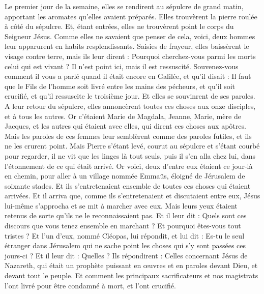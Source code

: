 \begin{multicols}{2}
\VerseOne{}Le premier jour de la semaine, elles se rendirent au sépulcre de grand matin, apportant les aromates qu'elles avaient préparés.
Elles trouvèrent la pierre roulée à côté du sépulcre.
Et, étant entrées, elles ne trouvèrent point le corps du Seigneur Jésus.
Comme elles ne savaient que penser de cela, voici, deux hommes leur apparurent en habits resplendissants.
Saisies de frayeur, elles baissèrent le visage contre terre, mais ils leur dirent : Pourquoi cherchez-vous parmi les morts celui qui est vivant ?
Il n'est point ici, mais il est ressuscité. Souvenez-vous comment il vous a parlé quand il était encore en Galilée,
et qu'il disait : Il faut que le Fils de l'homme soit livré entre les mains des pécheurs, et qu'il soit crucifié, et qu'il ressuscite le troisième jour.
Et elles se souvinrent de ses paroles.
A leur retour du sépulcre, elles annoncèrent toutes ces choses aux onze disciples, et à tous les autres.
Or c'étaient Marie de Magdala, Jeanne, Marie, mère de Jacques, et les autres qui étaient avec elles, qui dirent ces choses aux apôtres.
Mais les paroles de ces femmes leur semblèrent comme des paroles futiles, et ils ne les crurent point.
Mais Pierre s'étant levé, courut au sépulcre et s'étant courbé pour regarder, il ne vit que les linges là tout seuls, puis il s'en alla chez lui, dans l'étonnement de ce qui était arrivé.
Or voici, deux d'entre eux étaient ce jour-là en chemin, pour aller à un village nommée Emmaüs, éloigné de Jérusalem de soixante stades.
Et ils s'entretenaient ensemble de toutes ces choses qui étaient arrivées.
Et il arriva que, comme ils s'entretenaient et discutaient entre eux, Jésus lui-même s'approcha et se mit à marcher avec eux.
Mais leurs yeux étaient retenus de sorte qu'ils ne le reconnaissaient pas.
Et il leur dit : Quels sont ces discours que vous tenez ensemble en marchant ? Et pourquoi êtes-vous tout tristes ?
Et l'un d'eux, nommé Cléopas, lui répondit, et lui dit : Es-tu le seul étranger dans Jérusalem qui ne sache point les choses qui s'y sont passées ces jours-ci ?
Et il leur dit : Quelles ? Ils répondirent : Celles concernant Jésus de Nazareth, qui était un prophète puissant en œuvres et en paroles devant Dieu, et devant tout le peuple.
Et comment les principaux sacrificateurs et nos magistrats l'ont livré pour être condamné à mort, et l'ont crucifié.

\end{multicols}
